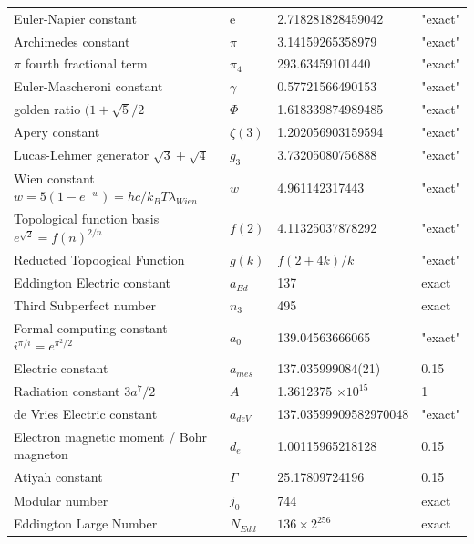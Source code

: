 \documentclass[a4paper,9pt]{article}
\begin{document}
\begin{appendix}
\begin{table}
\begin{tabular}{llll}
    Euler-Napier constant  & e    & 2.718281828459042 & "exact" \\    
    Archimedes constant & $\pi$    & 3.14159265358979 & "exact" \\    
    $\pi$ fourth fractional term & $\pi_4$    & 293.63459101440 & "exact" \\ 
    Euler-Mascheroni constant & $\gamma$    & 0.57721566490153 & "exact" \\    
    golden ratio $(1+\sqrt5/2$ & $\Phi $    & 1.618339874989485 & "exact" \\     
    Apery constant & $\zeta(3)$    & 1.202056903159594 & "exact" \\    
    Lucas-Lehmer generator $\sqrt3 + \sqrt4 $  & $g_3$    & 3.73205080756888 & "exact" \\    
    Wien constant $w = 5(1-e^{-w})= hc/k_BT\lambda_{Wien}$  & $w$    & 4.961142317443 & "exact" \\    
    Topological function basis $e^{\sqrt2} = f(n)^{2/n}$ & $f(2)  $    & 4.11325037878292 & "exact" \\    
    Reducted Topoogical Function & $g(k) $ &  $ f(2 + 4k)/k$  & "exact" \\  
    Eddington Electric constant  & $a_{Ed}$    & 137 & exact \\
    Third Subperfect number  & $n_{3}$    & 495 & exact \\ 
    Formal computing constant $i^{\pi /i} = e^{\pi ^2/2}$ & $a_0$ & 139.04563666065   & "exact" \\    
    Electric constant  & $a_{mes}$    & 137.035999084(21) & 0.15 \\    
    Radiation constant $3a^7/2$ & $A$    & 1.3612375 $\times 10^{15}$& 1 \\    
    de Vries Electric constant  & $a_{deV} $   & 137.03599909582970048 & "exact" \\    
    Electron magnetic moment / Bohr magneton  & $d_e$    & 1.00115965218128 & 0.15 \\    
    Atiyah constant & $\Gamma$    & 25.17809724196  & 0.15 \\    
    Modular number & $j_0$    & 744  & exact \\ 
    Eddington Large Number & $N_{Edd}$    & $136 \times 2^{256}$  & exact \\     

\end{tabular}
\end{table}
\end{appendix}
\end{document}
